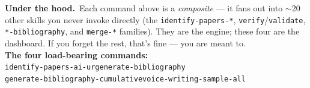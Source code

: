 \documentclass[11pt]{article}
\begin{document}
\vspace{12pt}

{\color{wgrey}\small
\textbf{Under the hood.}\ Each command above is a \emph{composite} — it fans out into $\sim$20 other skills you never invoke directly (the \texttt{identify-papers-*}, \texttt{verify}/\texttt{validate}, \texttt{*-bibliography}, and \texttt{merge-*} families). They are the engine; these four are the dashboard. If you forget the rest, that's fine --- you are meant to.\\[6pt]
\textbf{The four load-bearing commands:}\\[3pt]
\hspace*{1em}\texttt{identify-papers-ai-ur}\hfill\texttt{generate-bibliography}\hspace*{1em}\\[2pt]
\hspace*{1em}\texttt{generate-bibliography-cumulative}\hfill\texttt{voice-writing-sample-all}\hspace*{1em}
}
\end{document}
